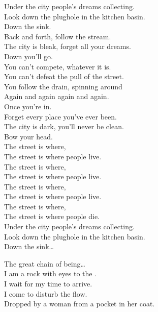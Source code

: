 Under the city people's dreams collecting. \\
Look down the plughole in the kitchen basin. \\

Down the sink. \\
Back and forth, follow the stream. \\
The city is bleak, forget all your dreams. \\
Down you'll go. \\

You can't compete, whatever it is. \\
You can't defeat the pull of the street. \\
You follow the drain, spinning around \\
Again and again again and again. \\

Once you're in. \\
Forget every place you've ever been. \\
The city is dark, you'll never be clean. \\
Bow your head. \\

The street is where, \\
The street is where people live. \\
The street is where, \\
The street is where people live. \\
The street is where, \\
The street is where people live. \\
The street is where, \\
The street is where people die. \\

Under the city people's dreams collecting. \\
Look down the plughole in the kitchen basin. \\

Down the sink… \\





The great chain of being… \\

I am a rock with eyes to the . \\
I wait for my time to arrive. \\
I come to disturb the flow. \\
Dropped by a woman from a pocket in her coat. \\

